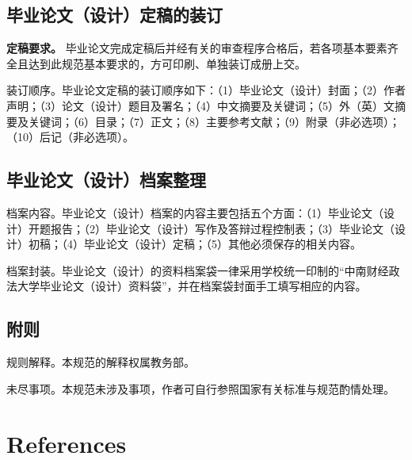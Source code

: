 \documentclass[singlesided]{Style/ucasthesis}%
\begin{document}
\hypertarget{section-33}{%
\section{毕业论文（设计）定稿的装订}\label{section-33}}

\textbf{定稿要求。} 毕业论文完成定稿后并经有关的审查程序合格后，若各项基本要素齐全且达到此规范基本要求的，方可印刷、单独装订成册上交。

装订顺序。毕业论文定稿的装订顺序如下：（1）毕业论文（设计）封面；（2）作者声明；（3）论文（设计）题目及署名；（4）中文摘要及关键词；（5）外（英）文摘要及关键词；（6）目录；（7）正文；（8）主要参考文献；（9）附录（非必选项）；（10）后记（非必选项）。

\hypertarget{section-34}{%
\section{毕业论文（设计）档案整理}\label{section-34}}

档案内容。毕业论文（设计）档案的内容主要包括五个方面：（1）毕业论文（设计）开题报告；（2）毕业论文（设计）写作及答辩过程控制表；（3）毕业论文（设计）初稿；（4）毕业论文（设计）定稿；（5）其他必须保存的相关内容。

档案封装。毕业论文（设计）的资料档案袋一律采用学校统一印制的``中南财经政法大学毕业论文（设计）资料袋''，并在档案袋封面手工填写相应的内容。

\hypertarget{section-35}{%
\section{附则}\label{section-35}}

规则解释。本规范的解释权属教务部。

未尽事项。本规范未涉及事项，作者可自行参照国家有关标准与规范酌情处理。

\flushbottom

\hypertarget{references}{%
\chapter*{References}\label{references}}


\end{document}
